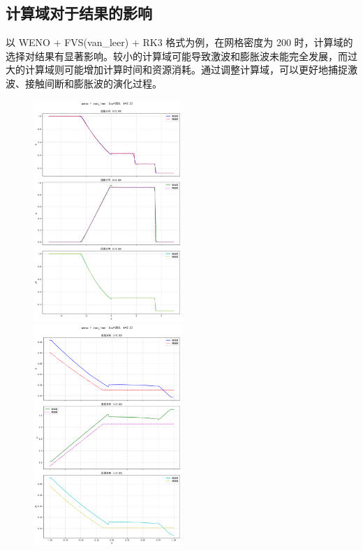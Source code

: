 \documentclass[UTF8]{ctexart}
\begin{document}
\subsection{计算域对于结果的影响}
以 WENO + FVS(van\_leer) + RK3 格式为例，在网格密度为 200 时，计算域的选择对结果有显著影响。较小的计算域可能导致激波和膨胀波未能完全发展，而过大的计算域则可能增加计算时间和资源消耗。通过调整计算域，可以更好地捕捉激波、接触间断和膨胀波的演化过程。
\begin{figure}
    \includegraphics[width=0.5\textwidth]{5-2.png}
    \includegraphics[width=0.5\textwidth]{1-2.png}\\

\end{figure}
\end{document}
